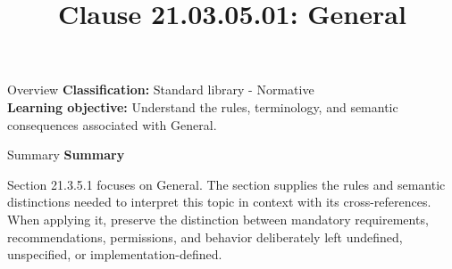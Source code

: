 \documentclass[10pt,letterpaper]{article}
\title{Clause 21.03.05.01: General}
\author{}
\date{}
\begin{document}
\maketitle
\begin{CornellOverviewBox}{Overview}
\textbf{Classification:} Standard library - Normative\\[2pt]
\textbf{Learning objective:} Understand the rules, terminology, and semantic consequences associated with General.
\end{CornellOverviewBox}\begin{CornellSummaryBox}{Summary}
{\sffamily\bfseries\color{Accent} Summary}\par\vspace{3pt}Section 21.3.5.1 focuses on General. The section supplies the rules and semantic distinctions needed to interpret this topic in context with its cross-references. When applying it, preserve the distinction between mandatory requirements, recommendations, permissions, and behavior deliberately left undefined, unspecified, or implementation-defined.
\end{CornellSummaryBox}
\end{document}
